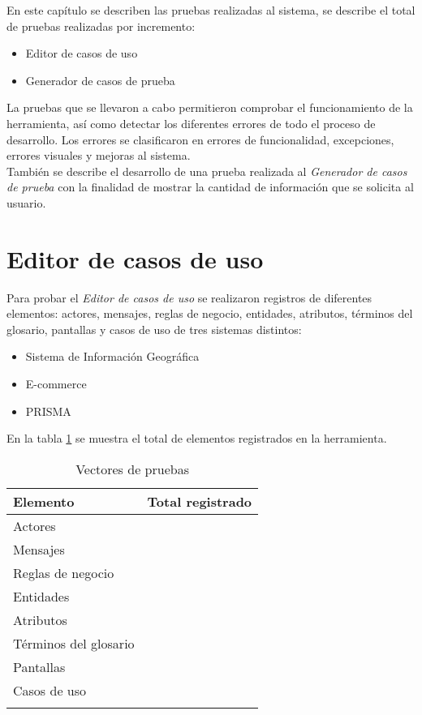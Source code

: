 En este capítulo se describen las pruebas realizadas al sistema, se describe el total de pruebas realizadas por incremento:
\begin{itemize}
 \item Editor de casos de uso
 \item Generador de casos de prueba 
\end{itemize}

La pruebas que se llevaron a cabo permitieron comprobar el funcionamiento de la herramienta, así como detectar los diferentes errores de todo el proceso de desarrollo. 
Los errores se clasificaron en errores de funcionalidad, excepciones, errores visuales y mejoras al sistema.\\

También se describe el desarrollo de una prueba realizada al {\it Generador de casos de prueba} con la finalidad de mostrar la cantidad de información 
que se solicita al usuario.

\section{Editor de casos de uso}

Para probar el {\it Editor de casos de uso} se realizaron registros de diferentes elementos: actores, mensajes, reglas de negocio, entidades, atributos, términos del glosario, pantallas y casos de uso de
tres sistemas distintos:

\begin{itemize}
 \item Sistema de Información Geográfica
 \item E-commerce
 \item PRISMA
\end{itemize}

En la tabla \ref{tabla:vectorEditor} se muestra el total de elementos registrados en la herramienta.

\begin{longtable}{| p{} | p{} |}%
	\arrayrulecolor{black}%
	\rowcolor{black}%
	{\color{white}Elemento} & {\color{white}Total registrado}\\ \hline
	\endhead%
	\arrayrulecolor{black}%
	Actores & \totalACT \\ \hline
	Mensajes & \totalMSG \\ \hline
	Reglas de negocio & \totalRN \\ \hline
	Entidades & \totalENT \\ \hline
	Atributos & \totalATR \\ \hline
	Términos del glosario & \totalGLS \\ \hline
	Pantallas & \totalIU \\ \hline
	Casos de uso & \totalCUEditor \\ \hline
	\caption{Vectores de pruebas}\label{tabla:vectorEditor}
\end{longtable}%


